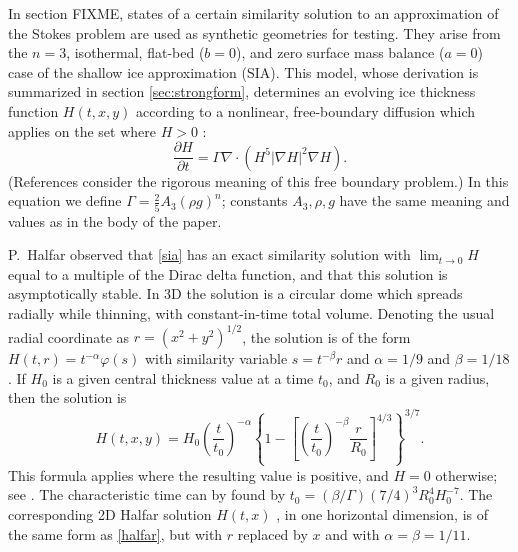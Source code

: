 \documentclass[letterpaper,final,12pt,reqno]{amsart}
\newcommand{\grad}{\nabla}
\newcommand{\Div}{\nabla\cdot}
\begin{document}
In section FIXME, states of a certain similarity solution to an approximation of the Stokes problem are used as synthetic geometries for testing.  They arise from the $n=3$, isothermal, flat-bed ($b=0$), and zero surface mass balance ($a=0$) case of the shallow ice approximation (SIA).  This model, whose derivation is summarized in section \ref{sec:strongform}, determines an evolving ice thickness function $H(t,x,y)$ according to a nonlinear, free-boundary diffusion which applies on the set where $H>0$ \cite{Fowler1997}:
\begin{equation}
\frac{\partial H}{\partial t} = \Gamma \Div \left(H^5 |\grad H|^2 \grad H\right). \label{sia}
\end{equation}
(References \cite{Bueler2016,JouvetBueler2012} consider the rigorous meaning of this free boundary problem.)  In this equation we define $\Gamma = \frac{2}{5} A_3 (\rho g)^n$; constants $A_3,\rho,g$ have the same meaning and values as in the body of the paper.

P.~Halfar \cite{Halfar1981} observed that \eqref{sia} has an exact similarity solution with $\lim_{t\to 0} H$ equal to a multiple of the Dirac delta function, and that this solution is asymptotically stable.  In 3D \cite{Halfar1983} the solution is a circular dome which spreads radially while thinning, with constant-in-time total volume.  Denoting the usual radial coordinate as $r=(x^2+y^2)^{1/2}$, the solution is of the form $H(t,r) = t^{-\alpha} \varphi(s)$ with similarity variable $s=t^{-\beta} r$ and $\alpha=1/9$ and $\beta=1/18$.  If $H_0$ is a given central thickness value at a time $t_0$, and $R_0$ is a given radius, then the solution is
\begin{equation}
H(t,x,y) = H_0 \left(\frac{t}{t_0}\right)^{-\alpha} \left\{1 - \left[\left(\frac{t}{t_0}\right)^{-\beta} \frac{r}{R_0}\right]^{4/3}\right\}^{3/7}. \label{halfar}
\end{equation}
This formula applies where the resulting value is positive, and $H=0$ otherwise; see \cite{Bueleretal2005}.  The characteristic time can by found by $t_0 = (\beta/\Gamma) (7/4)^3 R_0^4 H_0^{-7}$.  The corresponding 2D Halfar solution $H(t,x)$ \cite{Halfar1981}, in one horizontal dimension, is of the same form as \eqref{halfar}, but with $r$ replaced by $x$ and with $\alpha=\beta=1/11$.

\small

\bigskip


\end{document}
